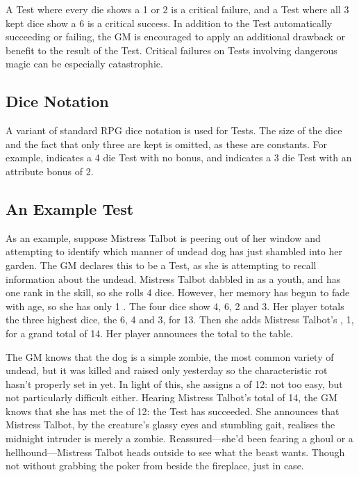 A Test where every die shows a 1 or 2 is a critical failure, and a Test where all 3 kept dice show a 6 is a critical success.
In addition to the Test automatically succeeding or failing, the GM is encouraged to apply an additional drawback or benefit to the result of the Test.
Critical failures on Tests involving dangerous magic can be especially catastrophic.

\subsection{Dice Notation}

A variant of standard RPG dice notation is used for Tests.
The size of the dice and the fact that only three are kept is omitted, as these are constants.
For example,  indicates a 4 die Test with no bonus, and  indicates a 3 die Test with an attribute bonus of 2.

\subsection{An Example Test}

As an example, suppose Mistress Talbot is peering out of her window and attempting to identify which manner of undead dog has just shambled into her garden.
The GM declares this to be a  Test, as she is attempting to recall information about the undead.
Mistress Talbot dabbled in  as a youth, and has one rank in the skill, so she rolls 4 dice.
However, her memory has begun to fade with age, so she has only 1 .
The four dice show 4, 6, 2 and 3.
Her player totals the three highest dice, the 6, 4 and 3, for 13.
Then she adds Mistress Talbot's , 1, for a grand total of 14.
Her player announces the total to the table.

The GM knows that the dog is a simple zombie, the most common variety of undead, but it was killed and raised only yesterday so the characteristic rot hasn't properly set in yet.
In light of this, she assigns a {\targetnumber} of 12: not too easy, but not particularly difficult either.
Hearing Mistress Talbot's total of 14, the GM knows that she has met the {\tn} of 12: the Test has succeeded.
She announces that Mistress Talbot, by the creature's glassy eyes and stumbling gait, realises the midnight intruder is merely a zombie.
Reassured---she'd been fearing a ghoul or a hellhound---Mistress Talbot heads outside to see what the beast wants.
Though not without grabbing the poker from beside the fireplace, just in case.

